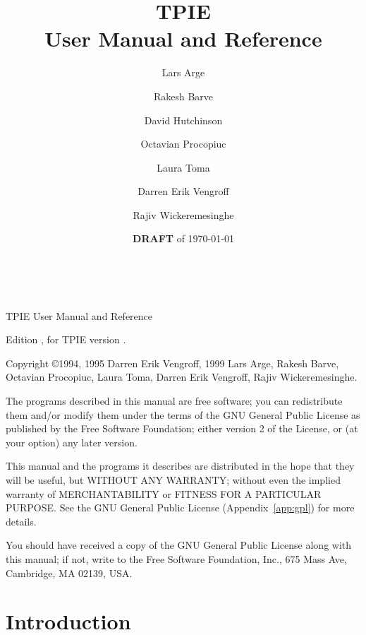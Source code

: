 \title{{\Huge TPIE}\\ User Manual and Reference}
\author{Lars Arge \and Rakesh Barve \and David Hutchinson \and Octavian Procopiuc \and Laura
Toma\and  Darren Erik Vengroff \and Rajiv Wickeremesinghe}
\date{{\bf DRAFT} of \today}

\maketitle

\begin{titlepage}

\mbox{ }

\vspace{\fill}


\noindent TPIE User Manual and Reference

\noindent Edition \edition, for TPIE version \version.

\vspace{2 ex}

\noindent Copyright \copyright 1994, 1995 Darren Erik Vengroff, 1999 Lars
Arge, Rakesh Barve, Octavian Procopiuc, Laura Toma, Darren Erik
Vengroff, Rajiv Wickeremesinghe.

\vspace{2 ex}

The programs described in this manual are free software; you can
redistribute them and/or modify them under the terms of the GNU General
Public License as published by the Free Software Foundation; either
version 2 of the License, or (at your option) any later version.

This manual and the programs it describes are distributed in the hope
that they will be useful, but WITHOUT ANY WARRANTY; without even the
implied warranty of MERCHANTABILITY or FITNESS FOR A PARTICULAR
PURPOSE.  See the GNU General Public License (Appendix~\ref{app:gpl})
for more details.

You should have received a copy of the GNU General Public License
along with this manual; if not, write to the Free Software Foundation,
Inc., 675 Mass Ave, Cambridge, MA 02139, USA.
\end{titlepage}

\tableofcontents

\chapter*{Introduction}

